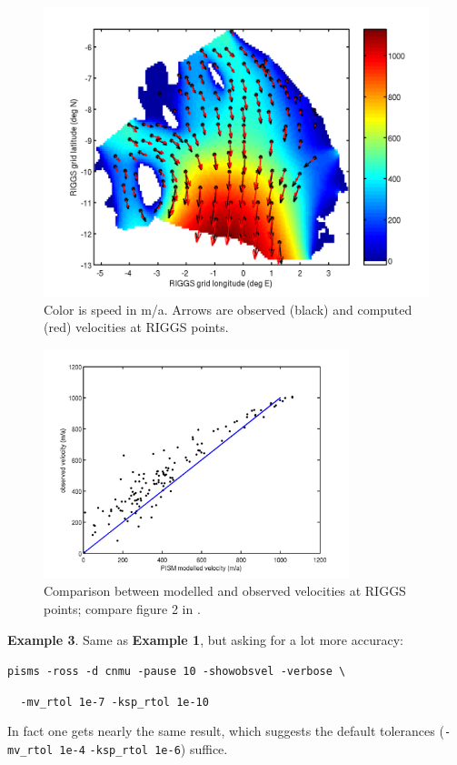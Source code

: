 \documentclass[11pt,final]{amsart}
\begin{document}
\begin{figure}[ht]
\includegraphics[width=4.5in,keepaspectratio=true]{figs/rossvelocities}
\caption{Color is speed in m/a.  Arrows are observed (black) and computed (red) velocities at RIGGS points.}
\label{fig:rossvelocities}
\end{figure}

\begin{figure}[ht]
\includegraphics[width=3.5in,keepaspectratio=true]{figs/rossscatter}
\caption{Comparison between modelled and observed velocities at RIGGS points; compare figure 2  in \cite{MacAyealetal}.}
\label{fig:rossscatter}
\end{figure}

\bigskip
\noindent\textbf{Example 3}.  Same as \textbf{Example 1}, but asking for a lot more accuracy:

\verb|pisms -ross -d cnmu -pause 10 -showobsvel -verbose \|

\verb|  -mv_rtol 1e-7 -ksp_rtol 1e-10|

\noindent In fact one gets nearly the same result,  which suggests the default tolerances (\verb|-mv_rtol 1e-4| \verb|-ksp_rtol 1e-6|) suffice.
\end{document}
